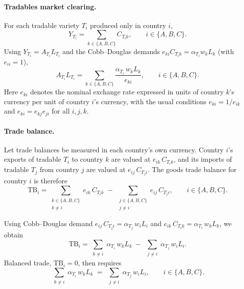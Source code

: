 \documentclass[11pt]{article}
\begin{document}
\paragraph{Tradables market clearing.}
For each tradable variety $T_i$ produced only in country $i$,
\begin{equation}
Y_{T_i}
=
\sum_{k \in \{A,B,C\}} C_{T_i k},
\qquad i \in \{A,B,C\}.
\end{equation}
Using $Y_{T_i} = A_{T_i} L_{T_i}$ and the Cobb--Douglas demands 
$e_{ki} C_{T_i k} = \alpha_{T_i} w_k L_k$ (with $e_{ii}=1$),
\begin{equation}
A_{T_i} L_{T_i}
=
\sum_{k \in \{A,B,C\}}
\frac{\alpha_{T_i}\, w_k L_k}{e_{ki}},
\qquad i \in \{A,B,C\}.
\label{eq:T_world_clearing_three_country}
\end{equation}
Here $e_{ki}$ denotes the nominal exchange rate expressed in units of country $k$’s currency per unit of country $i$’s currency, with the usual conditions $e_{ki} = 1/e_{ik}$ and $e_{ki} = e_{kj} e_{ji}$ for all $i,j,k$.

\paragraph{Trade balance.}
Let trade balances be measured in each country’s own currency. 
Country $i$’s exports of tradable $T_i$ to country $k$ are valued at 
$e_{ik}\, C_{T_i k}$, and its imports of tradable $T_j$ from country $j$ are valued at 
$e_{ij}\, C_{T_j i}$. 
The goods trade balance for country $i$ is therefore
\begin{equation}
\mathrm{TB}_i
=\sum_{\substack{k\in\{A,B,C\}\\ k\neq i}}
e_{ik}\, C_{T_i k}
\;-\;
\sum_{\substack{j\in\{A,B,C\}\\ j\neq i}}
e_{ij}\, C_{T_j i},
\qquad i\in\{A,B,C\}.
\label{eq:TB_three_country_def}
\end{equation}

Using Cobb--Douglas demand $e_{ij}\, C_{T_j i} = \alpha_{T_j}\, w_i L_i$ and $e_{ik}\, C_{T_i k} = \alpha_{T_i}\, w_k L_k$, we obtain
\begin{equation}
\mathrm{TB}_i
=
\sum_{\substack{k\neq i}}
\alpha_{T_i}\, w_k L_k
\;-\;
\sum_{\substack{j\neq i}}
\alpha_{T_j}\, w_i L_i.
\label{eq:TB_three_country_substituted}
\end{equation}
Balanced trade, $\mathrm{TB}_i=0$, then requires
\begin{equation}
\sum_{\substack{k\neq i}}
\alpha_{T_i}\, w_k L_k
\;=\;
\sum_{\substack{j\neq i}}
\alpha_{T_j}\, w_i L_i,
\qquad i\in\{A,B,C\}.
\label{eq:TB_three_country_condition}
\end{equation}
\end{document}
